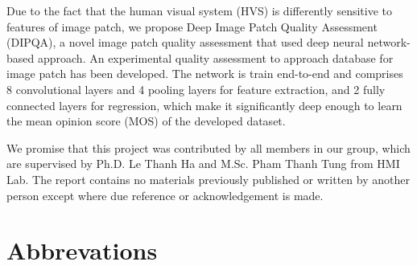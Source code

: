 \documentclass[12pt]{report}
\begin{document}
Due to the fact that the human visual system (HVS) is differently sensitive to features of image patch, we propose Deep Image Patch Quality Assessment (DIPQA), a novel image patch quality assessment that used deep neural network-based approach. An experimental quality assessment to approach database for image patch has been developed. The network is train end-to-end and comprises 8 convolutional layers and 4 pooling layers for feature extraction, and 2 fully connected layers for regression, which make it significantly deep enough to learn the mean opinion score (MOS) of the developed dataset.

We promise that this project was contributed by all members in our group, which are supervised by Ph.D. Le Thanh Ha and M.Sc. Pham Thanh Tung from HMI Lab. The report contains no materials previously published or written by another person except where due reference or acknowledgement is made.
%
\tableofcontents
\listoffigures
\listoftables

\chapter*{Abbrevations}
%
\newpage\cleardoublepage
\newpage\cleardoublepage
\newpage\cleardoublepage
\newpage\cleardoublepage
\newpage\cleardoublepage

\nocite{*}
\newpage\cleardoublepage

\end{document}
